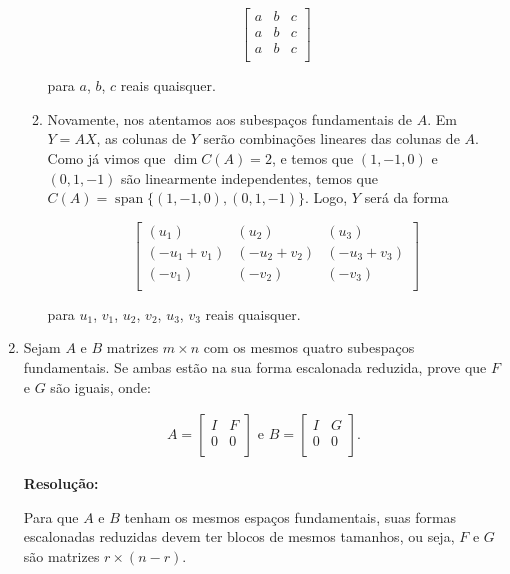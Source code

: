 \documentclass[leqno]{article}
\DeclareMathOperator{\spn}{span}
\begin{document}
\begin{enumerate}
\begin{enumerate}
        $$\begin{bmatrix}
            a & b & c\\
            a & b & c\\
            a & b & c\\
        \end{bmatrix}$$
        
        para $a$, $b$, $c$ reais quaisquer.
        
        \item Novamente, nos atentamos aos subespaços fundamentais de $A$. Em $Y=AX$, as colunas de $Y$ serão combinações lineares das colunas de $A$. Como já vimos que $\dim C(A)=2$, e temos que $(1,-1,0)$ e $(0,1,-1)$ são linearmente independentes, temos que $C(A)=\spn\{(1,-1,0),(0,1,-1)\}$. Logo, $Y$ será da forma
        
        $$\begin{bmatrix}
            (u_1) & (u_2) & (u_3)\\
            (-u_1+v_1) & (-u_2+v_2) & (-u_3+v_3)\\
            (-v_1) & (-v_2) & (-v_3)\\
        \end{bmatrix}$$
        
        para $u_1$, $v_1$, $u_2$, $v_2$, $u_3$, $v_3$ reais quaisquer.
    \end{enumerate}
    
    \item Sejam $A$ e $B$ matrizes $m\times n$ com os mesmos quatro subespaços fundamentais. Se ambas estão na sua forma escalonada reduzida, prove que $F$ e $G$ são iguais, onde:
    
    \begin{align*}
        A=\begin{bmatrix}I & F\\0 & 0\\\end{bmatrix}\text{ e }B=\begin{bmatrix}I & G\\0 & 0\\\end{bmatrix}\text{.}
    \end{align*}
    
    \textbf{Resolução:}
    
    Para que $A$ e $B$ tenham os mesmos espaços fundamentais, suas formas escalonadas reduzidas devem ter blocos de mesmos tamanhos, ou seja, $F$ e $G$ são matrizes $r\times(n-r)$.
    

\end{enumerate}
\end{document}
